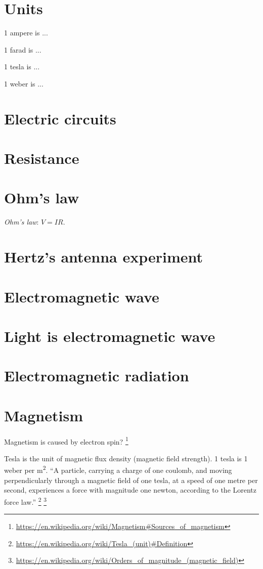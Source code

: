 \section{Units}

1 ampere is ...

1 farad is ...

1 tesla is ...

1 weber is ...

\section{Electric circuits}

\section{Resistance}

\section{Ohm's law}

\emph{Ohm's law}: \( V = IR \).

\section{Hertz's antenna experiment}

\section{Electromagnetic wave}

\section{Light is electromagnetic wave}

\section{Electromagnetic radiation}

\section{Magnetism}

Magnetism is caused by electron spin?%
\footnote{\url{https://en.wikipedia.org/wiki/Magnetism\#Sources_of_magnetism}}

Tesla is the unit of magnetic flux density (magnetic field strength).
1 tesla is 1 weber per \si{m^2}.
\enquote{A particle, carrying a charge of one coulomb, and moving perpendicularly through a magnetic field of one tesla,
at a speed of one metre per second, experiences a force with magnitude one newton, according to the Lorentz force law.}%
\footnote{\url{https://en.wikipedia.org/wiki/Tesla_(unit)\#Definition}}%
\footnote{\url{https://en.wikipedia.org/wiki/Orders_of_magnitude_(magnetic_field)}}
